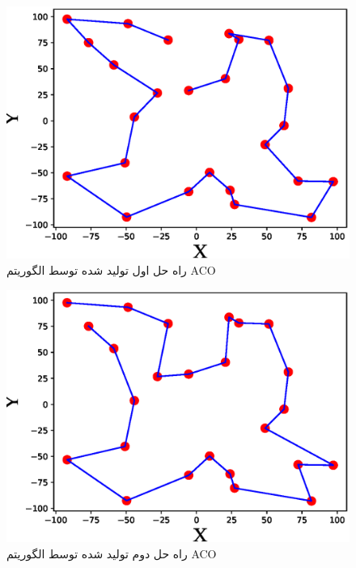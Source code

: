 \begin{figure}[H]\label{fig:part_I_ACO_sol_1}
	\caption{راه حل اول تولید شده توسط الگوریتم ACO} 
	\centering 
	\includegraphics[width=16cm]{../Figure/Q2/ACO_solution} 
\end{figure}

\begin{figure}[H]\label{fig:part_I_ACO_sol_2}
	\caption{راه حل دوم تولید شده توسط الگوریتم ACO} 
	\centering 
	\includegraphics[width=16cm]{../Figure/Q2/ACO_solution_1} 
\end{figure}


